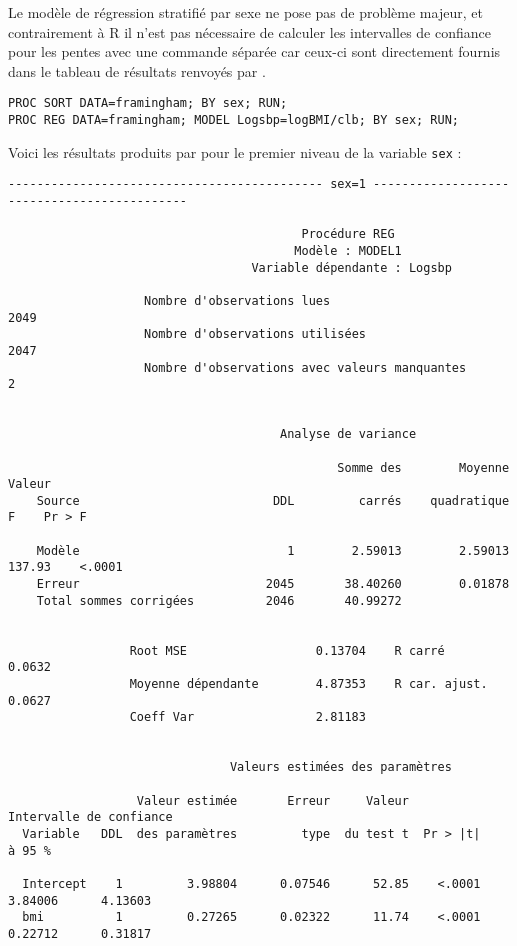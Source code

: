 Le modèle de régression stratifié par sexe ne pose pas de problème majeur,
et contrairement à R il n'est pas nécessaire de calculer les intervalles de
confiance pour les pentes avec une commande séparée car ceux-ci sont
directement fournis dans le tableau de résultats renvoyés par \SAS.
\begin{verbatim}
PROC SORT DATA=framingham; BY sex; RUN;
PROC REG DATA=framingham; MODEL Logsbp=logBMI/clb; BY sex; RUN;
\end{verbatim}

Voici les résultats produits par \SAS pour le premier niveau de la variable \texttt{sex} :
\begin{verbatim}
-------------------------------------------- sex=1 --------------------------------------------

                                         Procédure REG
                                        Modèle : MODEL1
                                  Variable dépendante : Logsbp

                   Nombre d'observations lues                           2049
                   Nombre d'observations utilisées                      2047
                   Nombre d'observations avec valeurs manquantes           2


                                      Analyse de variance

                                              Somme des        Moyenne     Valeur
    Source                           DDL         carrés    quadratique          F    Pr > F

    Modèle                             1        2.59013        2.59013     137.93    <.0001
    Erreur                          2045       38.40260        0.01878
    Total sommes corrigées          2046       40.99272


                 Root MSE                  0.13704    R carré           0.0632
                 Moyenne dépendante      ￼ 4.87353    R car. ajust.     0.0627
                 Coeff Var                ￼2.81183


                               Valeurs estimées des paramètres

                  Valeur estimée       Erreur     Valeur             Intervalle de confiance
  Variable   DDL  des paramètres         type  du test t  Pr > |t|           à 95 %

  Intercept    1         3.98804      0.07546      52.85    <.0001      3.84006      4.13603
  bmi          1         0.27265      0.02322      11.74    <.0001      0.22712      0.31817
\end{verbatim}


